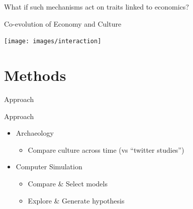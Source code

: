 \documentclass[12pt, notes=show]{beamer}
\begin{document}
\begin{frame}
	\begin{center}
	    What if such mechanisms act on traits linked to economics?
	\end{center}
	\begin{center}
	\end{center}
\end{frame}

%
\begin{frame}{Co-evolution of Economy and Culture}

    \begin{center}
	\texttt{[image: images/interaction]}	
    \end{center}

\end{frame}



\section{Methods}
\begin{frame}
    \centering
    \Large
    Approach
\end{frame}


\begin{frame}{Approach}
    \begin{itemize}
	\item Archaeology
	    \begin{itemize}
		\item<3-> Compare culture across time (vs ``twitter studies'')
	    \end{itemize}
	    \vfill
	\item<2-> Computer Simulation
	    \begin{itemize}
		\item<4-> Compare \& Select models
		\item<5-> Explore \& Generate hypothesis
	    \end{itemize}
	    \vfill
    \end{itemize}
\end{frame}
\end{document}
